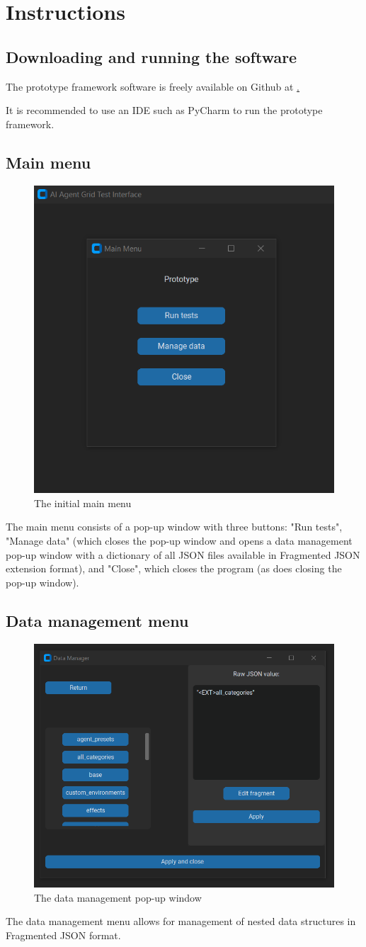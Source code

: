 \documentclass[masterthesis]{fer}
\begin{document}
\section{Instructions}
\subsection{Downloading and running the software}
The prototype framework software is freely available on Github at
\href{https://github.com/Dorijan-Cirkveni/diplomski-rad} .

It is recommended to use an IDE such as PyCharm to run the prototype framework.
\subsection{Main menu}
\begin{figure}[htb]
  \centering
  \includegraphics[width=0.5\linewidth]{Figures/thesis main menu.png} 
  \caption{The initial main menu}
  \label{slk:thesis_main_menu}
\end{figure}
The main menu consists of a pop-up window with three buttons: "Run tests", "Manage data" (which closes the pop-up window and opens a data management pop-up window with a dictionary of all JSON files available in Fragmented JSON extension format), and "Close", which closes the program (as does closing the pop-up window).

\subsection{Data management menu}
\begin{figure}[htb]
  \centering
  \includegraphics[width=0.5\linewidth]{Figures/thesis data management.png} 
  \caption{The data management pop-up window}
  \label{slk:thesis_data_management}
\end{figure}
The data management menu allows for management of nested data structures in Fragmented JSON format.
\end{document}
